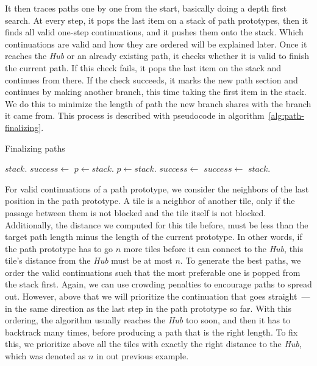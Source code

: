 It then traces paths one by one from the start, basically doing a depth first search.
At every step, it pops the last item on a stack of path prototypes, then it finds all valid one-step continuations, and it pushes them onto the stack.
Which continuations are valid and how they are ordered will be explained later.
Once it reaches the \emph{Hub} or an already existing path, it checks whether it is valid to finish the current path.
If this check fails, it pops the last item on the stack and continues from there.
If the check succeeds, it marks the new path section and continues by making another branch, this time taking the first item in the stack.
We do this to minimize the length of path the new branch shares with the branch it came from.
This process is described with pseudocode in algorithm~\ref{alg:path-finalizing}.

\begin{algorithm}[H]
    \caption{Finalizing paths}
    \label{alg:path-finalizing}
    \begin{algorithmic}[0]
        \State $stack$.
        \State $success \gets$ 
        \Statex
        \State $p \gets stack$.
        \Else
        \State $p \gets stack$.
        \EndIf
        \Statex
        \State $success \gets$ 
        \Else
        \State $success \gets$ 
        \State $stack$.
        \EndFor
        \EndIf
        \EndWhile
        \EndFor
        \Statex
    \end{algorithmic}
\end{algorithm}

For valid continuations of a path prototype, we consider the neighbors of the last position in the path prototype.
A tile is a neighbor of another tile, only if the passage between them is not blocked and the tile itself is not blocked.
Additionally, the distance we computed for this tile before, must be less than the target path length minus the length of the current prototype.
In other words, if the path prototype has to go $n$ more tiles before it can connect to the \emph{Hub}, this tile's distance from the \emph{Hub} must be at most $n$.
To generate the best paths, we order the valid continuations such that the most preferable one is popped from the stack first.
Again, we can use crowding penalties to encourage paths to spread out.
However, above that we will prioritize the continuation that goes straight~--- in the same direction as the last step in the path prototype so far.
With this ordering, the algorithm usually reaches the \emph{Hub} too soon, and then it has to backtrack many times, before producing a path that is the right length.
To fix this, we prioritize above all the tiles with exactly the right distance to the \emph{Hub}, which was denoted as $n$ in out previous example.


